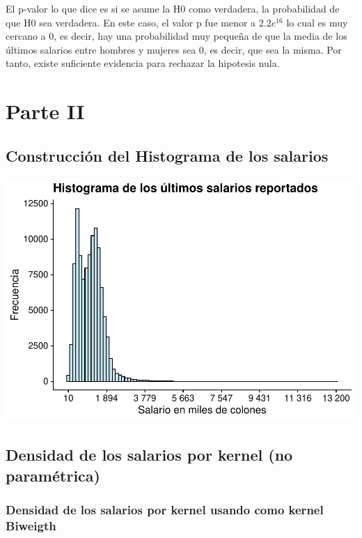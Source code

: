 \documentclass[
]{article}
\begin{document}
El p-valor lo que dice es si se asume la H0 como verdadera, la
probabilidad de que H0 sea verdadera. En este caso, el valor p fue menor
a \(2.2e^{16}\) lo cual es muy cercano a 0, es decir, hay una
probabilidad muy pequeña de que la media de los últimos salarios entre
hombres y mujeres sea 0, es decir, que sea la misma. Por tanto, existe
suficiente evidencia para rechazar la hipotesis nula.

\hypertarget{parte-ii}{%
\section{Parte II}\label{parte-ii}}

\hypertarget{construcciuxf3n-del-histograma-de-los-salarios}{%
\subsection{Construcción del Histograma de los
salarios}\label{construcciuxf3n-del-histograma-de-los-salarios}}

\includegraphics{Tarea1_files/figure-latex/unnamed-chunk-9-1.pdf}

\hypertarget{densidad-de-los-salarios-por-kernel-no-paramuxe9trica}{%
\subsection{Densidad de los salarios por kernel (no
paramétrica)}\label{densidad-de-los-salarios-por-kernel-no-paramuxe9trica}}

\hypertarget{densidad-de-los-salarios-por-kernel-usando-como-kernel-biweigth}{%
\subsubsection{Densidad de los salarios por kernel usando como kernel
Biweigth}\label{densidad-de-los-salarios-por-kernel-usando-como-kernel-biweigth}}
\end{document}
